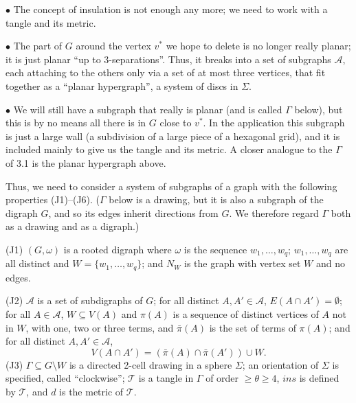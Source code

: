 \hspace*{12pt}$\bullet$ The concept of insulation is not enough any more; we need to work with a tangle and its metric.

\hspace*{12pt}$\bullet$ The part of $G$ around the vertex $v^*$ we hope to delete is no longer really planar; it is just planar ``up to 3-separations''. Thus, it breaks into a set of subgraphs $\mathcal{A}$, each attaching to the others only via a set of at most three vertices, that fit together as a ``planar hypergraph'', a system of discs in $\Sigma$.

\hspace*{12pt}$\bullet$ We will still have a subgraph that really is planar (and is called $\Gamma$ below), but this is by no means all there is in $G$ close to $v^*$. In the application this subgraph is just a large wall (a subdivision of a large piece of a hexagonal grid), and it is included mainly to give us the tangle and its metric. A closer analogue to the $\Gamma$ of 3.1 is the planar hypergraph above.

Thus, we need to consider a system of subgraphs of a graph with the following properties (J1)--(J6). ($\Gamma$ below is a drawing, but it is also a subgraph of the digraph $G$, and so its edges inherit directions from $G$. We therefore regard $\Gamma$ both as a drawing and as a digraph.)

\hspace*{12pt}(J1) $(G, \omega)$ is a rooted digraph where $\omega$ is the sequence $w_1, \dots, w_q$; $w_1, \dots, w_q$ are all distinct and $W = \{w_1, \dots, w_q\}$; and $N_W$ is the graph with vertex set $W$ and no edges.

\hspace*{12pt}(J2) $\mathcal{A}$ is a set of subdigraphs of $G$; for all distinct $A, A' \in \mathcal{A}$, $E(A \cap A') = \emptyset$; for all $A \in \mathcal{A}$, $W \subseteq V(A)$ and $\pi(A)$ is a sequence of distinct vertices of $A$ not in $W$, with one, two or three terms, and $\bar{\pi}(A)$ is the set of terms of $\pi(A)$; and for all distinct $A, A' \in \mathcal{A}$,
\begin{equation*}
V(A \cap A') = (\bar{\pi}(A) \cap \bar{\pi}(A')) \cup W.
\end{equation*}
\hspace*{12pt}(J3) $\Gamma \subseteq G \setminus W$ is a directed 2-cell drawing in a sphere $\Sigma$; an orientation of $\Sigma$ is specified, called ``clockwise''; $\mathcal{T}$ is a tangle in $\Gamma$ of order $\ge \theta \ge 4$, $ins$ is defined by $\mathcal{T}$, and $d$ is the metric of $\mathcal{T}$.


